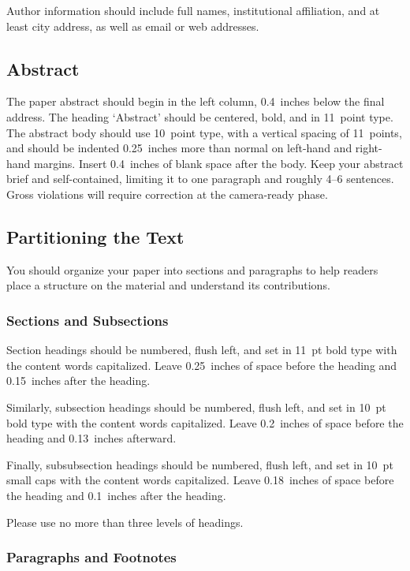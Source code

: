 \documentclass{article}
\begin{document}
Author information should include full names, institutional affiliation,
and at least city address, as well as email or web addresses.

\subsection{Abstract}

The paper abstract should begin in the left column, 0.4~inches below
the final address. The heading `Abstract' should be centered, bold,
and in 11~point type. The abstract body should use 10~point type, with
a vertical spacing of 11~points, and should be indented 0.25~inches
more than normal on left-hand and right-hand margins. Insert
0.4~inches of blank space after the body. Keep your abstract brief and 
self-contained,
limiting it to one paragraph and roughly 4--6 sentences.  Gross violations will require correction at the camera-ready phase.

\subsection{Partitioning the Text} 

You should organize your paper into sections and paragraphs to help
readers place a structure on the material and understand its
contributions.

\subsubsection{Sections and Subsections}

Section headings should be numbered, flush left, and set in 11~pt bold
type with the content words capitalized. Leave 0.25~inches of space
before the heading and 0.15~inches after the heading.

Similarly, subsection headings should be numbered, flush left, and set
in 10~pt bold type with the content words capitalized. Leave
0.2~inches of space before the heading and 0.13~inches afterward.

Finally, subsubsection headings should be numbered, flush left, and
set in 10~pt small caps with the content words capitalized. Leave
0.18~inches of space before the heading and 0.1~inches after the
heading. 

Please use no more than three levels of headings.

\subsubsection{Paragraphs and Footnotes}
\end{document}
